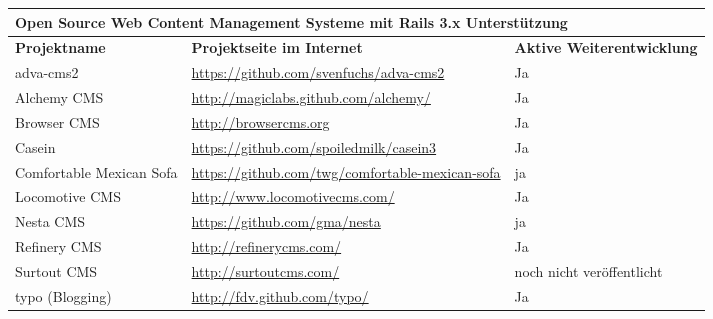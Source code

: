 \begin{table}
\center
\addtocounter{footnote}{1}
\begin{tabular}[]{|p{3cm}|p{8cm}|p{4cm}|}
\hline
\multicolumn{3}{|p{15cm}|}{\textbf{Open Source Web Content Management Systeme mit Rails 3.x Unterstützung}}\\
\hline
\textbf{Projektname}&\textbf{Projektseite im Internet}&\textbf{Aktive Weiterentwicklung}\\
\hline
adva-cms2 & \href{https://github.com/svenfuchs/adva-cms2}{https://github.com/svenfuchs/adva-cms2} & Ja \\
\hline
\cellcolor{alicegrey}Alchemy CMS & \cellcolor{alicegrey} \href{http://magiclabs.github.com/alchemy/}{http://magiclabs.github.com/alchemy/} &\cellcolor{alicegrey} Ja \\
\hline
\cellcolor{alicegrey}Browser CMS & \cellcolor{alicegrey} \href{http://browsercms.org}{http://browsercms.org} & \cellcolor{alicegrey} Ja \\
\hline
Casein & \href{https://github.com/spoiledmilk/casein3}{https://github.com/spoiledmilk/casein3} & Ja \\
\hline
Comfortable Mexican Sofa & \href{https://github.com/twg/comfortable-mexican-sofa}{https://github.com/twg/comfortable-mexican-sofa} & ja  \\
\hline
\cellcolor{alicegrey} Locomotive CMS & \cellcolor{alicegrey} \href{http://www.locomotivecms.com/}{http://www.locomotivecms.com/} & \cellcolor{alicegrey} Ja \\
\hline
Nesta CMS & \href{https://github.com/gma/nesta}{https://github.com/gma/nesta} & ja  \\
\hline
\cellcolor{alicegrey} Refinery CMS & \cellcolor{alicegrey} \href{http://refinerycms.com/}{http://refinerycms.com/} & \cellcolor{alicegrey} Ja \\
\hline
Surtout CMS & \href{http://surtoutcms.com/}{http://surtoutcms.com/} & noch nicht veröffentlicht \\
\hline
typo (Blogging) & \href{http://fdv.github.com/typo/}{http://fdv.github.com/typo/} & Ja \\
\hline
\end{tabular}
\end{table}

